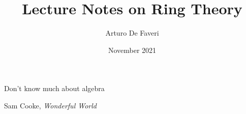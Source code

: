 \documentclass{article}
\title{Lecture Notes on Ring Theory}
\author{Arturo De Faveri}
\date{November 2021}
\theoremstyle{plain}
\theoremstyle{definition}
\theoremstyle{remark}
\begin{document}
\maketitle

\epigraph{Don’t know much about algebra}{Sam Cooke, \textit{Wonderful World}}















\end{document}
